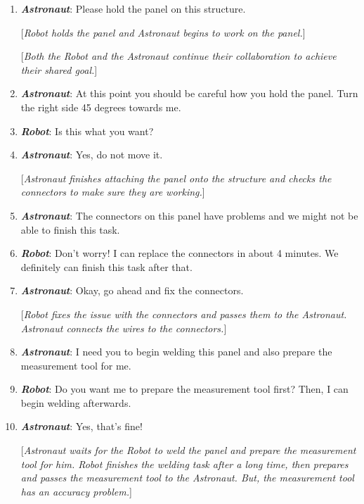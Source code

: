 \documentclass[12pt]{report}
\begin{document}
\begin{enumerate}
  \item \textit{\textbf{Astronaut}}: Please hold the panel on this structure. 
  
  [\textit{Robot holds the panel and Astronaut begins to work on the panel.}]

  [\textit{Both the Robot and the Astronaut continue their collaboration to
  achieve their shared goal.}]

  \item \textit{\textbf{Astronaut}}: At this point you should be careful how you
  hold the panel. Turn the right side 45 degrees towards me.

  \item \textit{\textbf{Robot}}: Is this what you want?

  \item \textit{\textbf{Astronaut}}: Yes, do not move it.

  [\textit{Astronaut finishes attaching the panel onto the structure and checks
  the connectors to make sure they are working.}]

  \item \textit{\textbf{Astronaut}}: The connectors on this panel have problems
  and we might not be able to finish this task.

  \item \textit{\textbf{Robot}}: Don't worry! I can replace the connectors in
  about 4 minutes. We definitely can finish this task after that.

  \item \textit{\textbf{Astronaut}}: Okay, go ahead and fix the connectors.

  [\textit{Robot fixes the issue with the connectors and passes them to the
  Astronaut. Astronaut connects the wires to the connectors.}]

  \item \textit{\textbf{Astronaut}}: I need you to begin welding this panel and
  also prepare the measurement tool for me.

  \item \textit{\textbf{Robot}}: Do you want me to prepare the measurement tool
  first? Then, I can begin welding afterwards.

  \item \textit{\textbf{Astronaut}}: Yes, that's fine!

  [\textit{Astronaut waits for the Robot to weld the panel and prepare the
  measurement tool for him. Robot finishes the welding task after a long time,
  then prepares and passes the measurement tool to the Astronaut. But, the
  measurement tool has an accuracy problem.}]


\end{enumerate}
\end{document}
